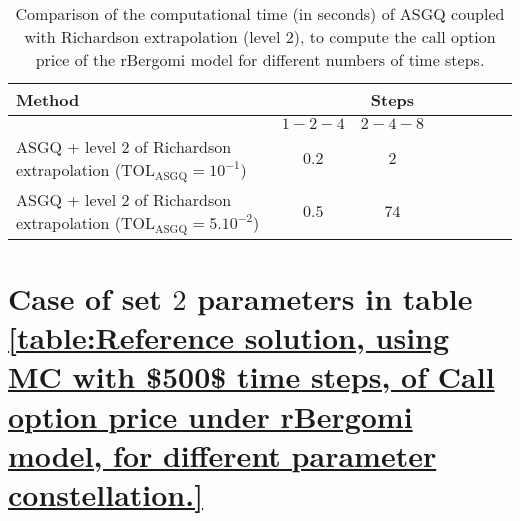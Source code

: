 \begin{table}[!h]
	\centering
	\begin{tabular}{l*{6}{c}r}
		\toprule[1.5pt]
		Method & & Steps  & &     \\
		\hline
		& $1-2-4$ & $2-4-8$   \\
		\hline
		
		ASGQ + level $2$ of  Richardson extrapolation ($\text{TOL}_{\text{ASGQ}}=10^{-1}$)  & $0.2$ & $2$ &   \\
		ASGQ + level $2$ of  Richardson extrapolation ($\text{TOL}_{\text{ASGQ}}=5.10^{-2}$)  & $0.5$ & $74$  \\
		\bottomrule[1.25pt]
	\end{tabular}
	\caption{Comparison of the computational time (in seconds) of ASGQ coupled with Richardson extrapolation (level $2$), to compute the call option price of the rBergomi model for different numbers of time steps.}
	\label{Comparsion of the computational time of  MC and MISC, using Richardson extrapolation (level $2$), used to compute Call option price of rBergomi model for different number of time steps. Case set $2$ parameters,linear}
\end{table}
\FloatBarrier


\section{Case of set $2$ parameters in table \ref{table:Reference solution, using MC with $500$ time steps, of Call option price under rBergomi model, for different parameter constellation.} }
\label{appendix:Case of set $2$ parameters}

\FloatBarrier

